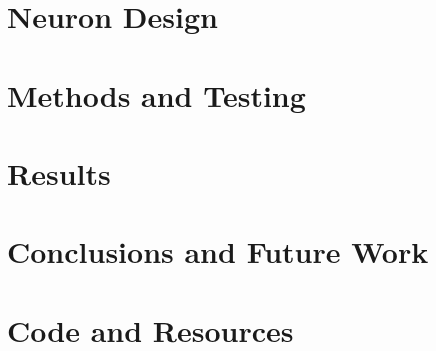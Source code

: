\documentclass[12pt, letterpaper, oneside, onecolumn]{report} %
\begin{document}
\chapter{Neuron Design}
\label{chap:neuron_design}


\chapter{Methods and Testing}
\label{chap:methods}


\chapter{Results}
\label{chap:results}


\chapter{Conclusions and Future Work}
\label{chap:conclusion}


\newpage
\appendix
{}
\chapter{Code and Resources}
\label{app:resources}


\newpage
\label{chap:references}
\printbibliography[heading=bibintoc, title={Bibliography}]
\end{document}
